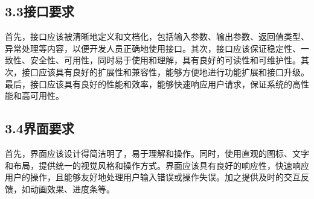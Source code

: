\documentclass[24pt,a4paper]{article}%
\begin{document}
\subsection*{\songti 3.3接口要求}
首先，接口应该被清晰地定义和文档化，包括输入参数、输出参数、返回值类型、异常处理等内容，以便开发人员正确地使用接口。其次，接口应该保证稳定性、一致性、安全性、可用性，同时易于使用和理解，具有良好的可读性和可维护性。其次，接口应该具有良好的扩展性和兼容性，能够方便地进行功能扩展和接口升级。最后，接口应该具有良好的性能和效率，能够快速响应用户请求，保证系统的高性能和高可用性。
\subsection*{\songti 3.4界面要求}
首先，界面应该设计得简洁明了，易于理解和操作。同时，使用直观的图标、文字和布局，提供统一的视觉风格和操作方式。界面应该具有良好的响应性，快速响应用户的操作，且能够友好地处理用户输入错误或操作失误。加之提供及时的交互反馈，如动画效果、进度条等。
\newpage
\end{document}
